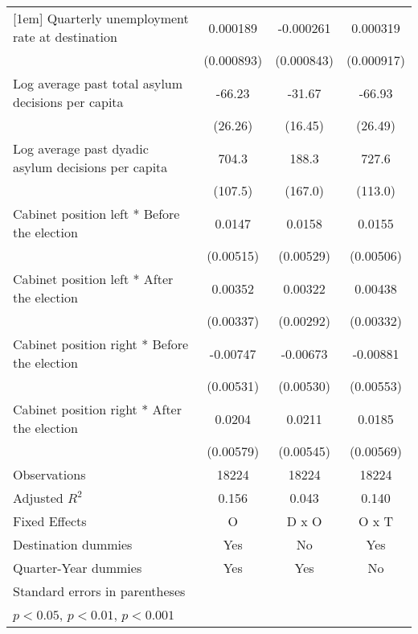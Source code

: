 \begin{table}[htbp]
\begin{tabular}{l*{3}{c}}
[1em]
Quarterly unemployment rate at destination&    0.000189         &   -0.000261         &    0.000319         \\
                    &  (0.000893)         &  (0.000843)         &  (0.000917)         \\
[1em]
Log average past total asylum decisions per capita&      -66.23\sym{*}  &      -31.67         &      -66.93\sym{*}  \\
                    &     (26.26)         &     (16.45)         &     (26.49)         \\
[1em]
Log average past dyadic asylum decisions per capita&       704.3\sym{***}&       188.3         &       727.6\sym{***}\\
                    &     (107.5)         &     (167.0)         &     (113.0)         \\
[1em]
Cabinet position left * Before the election&      0.0147\sym{**} &      0.0158\sym{**} &      0.0155\sym{**} \\
                    &   (0.00515)         &   (0.00529)         &   (0.00506)         \\
[1em]
Cabinet position left * After the election&     0.00352         &     0.00322         &     0.00438         \\
                    &   (0.00337)         &   (0.00292)         &   (0.00332)         \\
[1em]
Cabinet position right * Before the election&    -0.00747         &    -0.00673         &    -0.00881         \\
                    &   (0.00531)         &   (0.00530)         &   (0.00553)         \\
[1em]
Cabinet position right * After the election&      0.0204\sym{***}&      0.0211\sym{***}&      0.0185\sym{**} \\
                    &   (0.00579)         &   (0.00545)         &   (0.00569)         \\
\hline
Observations        &       18224         &       18224         &       18224         \\
Adjusted \(R^{2}\)  &       0.156         &       0.043         &       0.140         \\
Fixed Effects       &           O         &       D x O         &       O x T         \\
Destination dummies &         Yes         &          No         &         Yes         \\
Quarter-Year dummies&         Yes         &         Yes         &          No         \\
\hline\hline
\multicolumn{4}{l}{\footnotesize Standard errors in parentheses}\\
\multicolumn{4}{l}{\footnotesize \sym{*} \(p<0.05\), \sym{**} \(p<0.01\), \sym{***} \(p<0.001\)}\\
\end{tabular}
\end{table}

